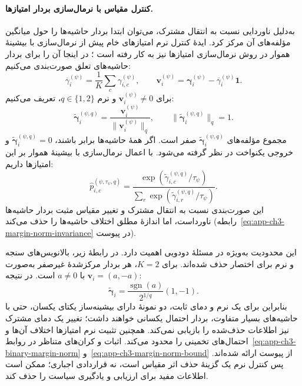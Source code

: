 \paragraph{کنترل مقیاس با نرمال‌سازی بردار امتیازها.}
به‌دلیل ناوردایی نسبت به انتقال مشترک، می‌توان ابتدا
بردار حاشیه‌ها را حول میانگین مؤلفه‌های آن مرکز کرد. ایدهٔ کنترل نرم امتیازهای خام پیش از نرمال‌سازی با بیشینهٔ هموار در روش نرمال‌سازی امتیازها نیز به کار رفته است \cite{Wei2022LogitNorm}؛ در اینجا آن را برای بردار حاشیه‌های تعلق صورت‌بندی می‌کنیم:
\begin{equation}\label{cmp:eq:ch3-centered-margin-vector}
\overline\gamma_i^{(\psi)}=\frac1K\sum_c\gamma_{i,c}^{(\psi)},
\qquad
\boldsymbol v_i^{(\psi)}=\boldsymbol\gamma_i^{(\psi)}
-\overline\gamma_i^{(\psi)}\mathbf1.
\end{equation}
برای $\boldsymbol v_i^{(\psi)}\ne0$ و نرم $q\in\{1,2\}$، تعریف می‌کنیم:
\begin{equation}\label{cmp:eq:ch3-margin-norm-scaling}
\boxed{\widetilde{\boldsymbol\gamma}_i^{(\psi,q)}=\frac{\boldsymbol v_i^{(\psi)}}{\|\boldsymbol v_i^{(\psi)}\|_q},
\qquad \|\widetilde{\boldsymbol\gamma}_i^{(\psi,q)}\|_q=1.}
\end{equation}
مجموع مؤلفه‌های $\widetilde{\boldsymbol\gamma}_i^{(\psi,q)}$ صفر است. اگر همهٔ
حاشیه‌ها برابر باشند، $\widetilde{\boldsymbol\gamma}_i^{(\psi,q)}=0$ و خروجی
یکنواخت در نظر گرفته می‌شود. با اعمال نرمال‌سازی
با بیشینهٔ هموار بر این امتیازها داریم:
\begin{equation}\label{cmp:eq:ch3-norm-margin-softmax}
\widehat p_{i,c}^{(\psi,\tau_\psi,q)}
=\frac{\exp(\widetilde\gamma_{i,c}^{(\psi,q)}/\tau_\psi)}
{\sum_r\exp(\widetilde\gamma_{i,r}^{(\psi,q)}/\tau_\psi)}.
\end{equation}
این صورت‌بندی نسبت به انتقال مشترک و تغییر مقیاس
مثبت بردار حاشیه‌ها ناورداست، اما اندازهٔ مطلق
اختلاف حاشیه‌ها را حذف می‌کند
(رابطه~\eqref{eq:app-ch3-margin-norm-invariance} در پیوست).

این محدودیت به‌ویژه در مسئلهٔ دودویی اهمیت دارد.
در رابطهٔ زیر، بالانویس‌های سنجه و نرم برای اختصار حذف شده‌اند.
برای $K=2$، هر بردار مرکز‌شدهٔ غیرصفر به‌صورت
$\boldsymbol v_i=(a,-a)$ با $a\ne0$ است. در نتیجه:
\begin{equation}\label{cmp:eq:ch3-binary-margin-norm}
\widetilde{\boldsymbol\gamma}_i=\frac{\operatorname{sgn}(a)}{2^{1/q}}(1,-1).
\end{equation}
بنابراین برای یک نرم و دمای ثابت، دو نمونهٔ
دارای بیشینه‌ساز یکتای یکسان، حتی با حاشیه‌های
بسیار متفاوت، بردار احتمال یکسانی خواهند داشت؛
تغییر یک دمای مشترک نیز اطلاعات حذف‌شده را بازیابی
نمی‌کند. همچنین تثبیت نرم امتیازها اختلاف آن‌ها
و احتمال‌های تخمینی را محدود می‌کند. اثبات و کران‌های
متناظر در روابط~\eqref{eq:app-ch3-binary-margin-norm}
و~\eqref{eq:app-ch3-margin-norm-bound} از پیوست
ارائه شده‌اند. پس کنترل نرم یک گزینهٔ حذف اثر مقیاس
است، نه قراردادی اجباری؛ ممکن است اطلاعات مفید
برای ارزیابی و یادگیری سیاست را حذف کند.

